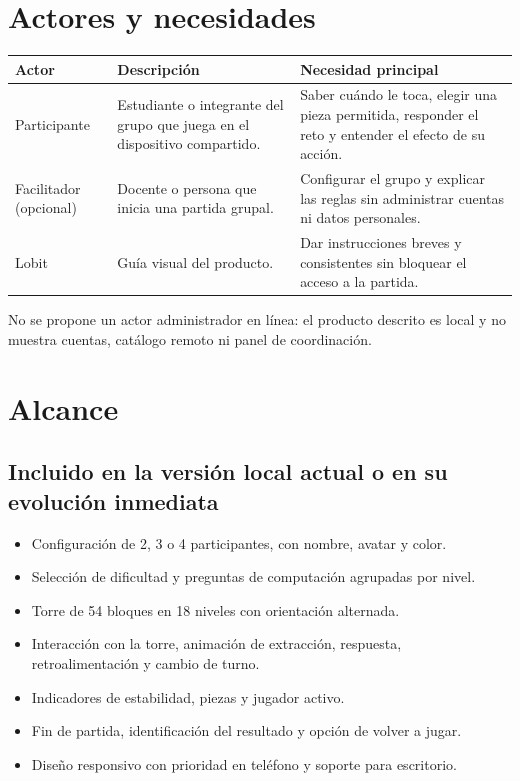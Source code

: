 \documentclass[11pt,letterpaper]{article}
\begin{document}
\section{Actores y necesidades}

\begin{tabularx}{.95\linewidth}{@{}p{.17\linewidth}YY@{}}
\toprule
\textbf{Actor} & \textbf{Descripción} & \textbf{Necesidad principal} \\
\midrule
Participante & Estudiante o integrante del grupo que juega en el dispositivo compartido. & Saber cuándo le toca, elegir una pieza permitida, responder el reto y entender el efecto de su acción. \\
Facilitador (opcional) & Docente o persona que inicia una partida grupal. & Configurar el grupo y explicar las reglas sin administrar cuentas ni datos personales. \\
Lobit & Guía visual del producto. & Dar instrucciones breves y consistentes sin bloquear el acceso a la partida. \\
\bottomrule
\end{tabularx}

No se propone un actor administrador en línea: el producto descrito es local y no muestra cuentas, catálogo remoto ni panel de coordinación.

\section{Alcance}

\subsection{Incluido en la versión local actual o en su evolución inmediata}
\begin{itemize}
  \item Configuración de 2, 3 o 4 participantes, con nombre, avatar y color.
  \item Selección de dificultad y preguntas de computación agrupadas por nivel.
  \item Torre de 54 bloques en 18 niveles con orientación alternada.
  \item Interacción con la torre, animación de extracción, respuesta, retroalimentación y cambio de turno.
  \item Indicadores de estabilidad, piezas y jugador activo.
  \item Fin de partida, identificación del resultado y opción de volver a jugar.
  \item Diseño responsivo con prioridad en teléfono y soporte para escritorio.
\end{itemize}
\end{document}
